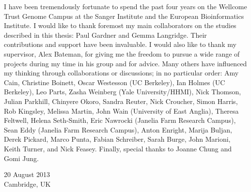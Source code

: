 

\begin{acknowledgementslong} 

I have been tremendously fortunate to spend the past four years on the Wellcome Trust Genome Campus at the Sanger Institute and the European Bioinformatics Institute. I would like to thank foremost my main collaborators on the studies described in this thesis: Paul Gardner and Gemma Langridge. Their contributions and support have been invaluable. I would also like to thank my supervisor, Alex Bateman, for giving me the freedom to pursue a wide range of projects during my time in his group and for advice. Many others have influenced my thinking through collaborations or discussions; in no particular order: Amy Cain, Christine Boinett, Oscar Westesson (UC Berkeley), Ian Holmes (UC Berkeley), Leo Parts, Zasha Weinberg (Yale University/HHMI), Nick Thomson, Julian Parkhill, Chinyere Okoro, Sandra Reuter, Nick Croucher, Simon Harris, Rob Kingsley, Melissa Martin, John Wain (University of East Anglia), Theresa Feltwell, Helena Seth-Smith, Eric Nawrocki (Janelia Farm Research Campus), Sean Eddy (Janelia Farm Research Campus), Anton Enright, Marija Buljan, Derek Pickard, Marco Punta, Fabian Schreiber, Sarah Burge, John Marioni, Keith Turner, and Nick Feasey. Finally, special thanks to Joanne Chung and Gomi Jung.

\vspace{10 mm}
\noindent
 \begin{flushright}
20 August 2013\\
Cambridge, UK
\end{flushright}

\end{acknowledgementslong}


